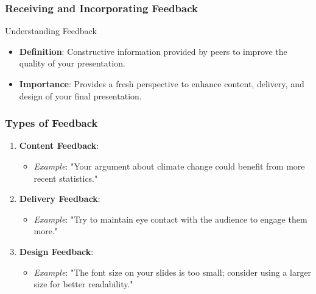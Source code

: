 \documentclass[aspectratio=169]{beamer}
\begin{document}
\begin{frame}[fragile]
    \frametitle{Receiving and Incorporating Feedback}
    \begin{block}{Understanding Feedback}
        \begin{itemize}
            \item \textbf{Definition}: Constructive information provided by peers to improve the quality of your presentation.
            \item \textbf{Importance}: Provides a fresh perspective to enhance content, delivery, and design of your final presentation.
        \end{itemize}
    \end{block}
\end{frame}

\begin{frame}[fragile]
    \frametitle{Types of Feedback}
    \begin{enumerate}
        \item \textbf{Content Feedback}:
            \begin{itemize}
                \item \textit{Example}: "Your argument about climate change could benefit from more recent statistics."
            \end{itemize}
        \item \textbf{Delivery Feedback}:
            \begin{itemize}
                \item \textit{Example}: "Try to maintain eye contact with the audience to engage them more."
            \end{itemize}
        \item \textbf{Design Feedback}:
            \begin{itemize}
                \item \textit{Example}: "The font size on your slides is too small; consider using a larger size for better readability."
            \end{itemize}
    \end{enumerate}
\end{frame}
\end{document}
